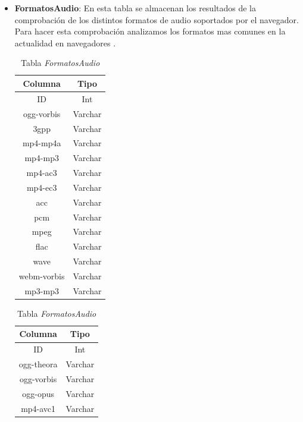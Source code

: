 \begin{itemize}
    \item \textbf{FormatosAudio}: En esta tabla se almacenan los resultados de la comprobación de los distintos formatos de audio soportados por el navegador. Para hacer esta comprobación analizamos los formatos mas comunes en la actualidad en navegadores \cite{Formatos}. \par
    \begin{table}[tbp]
    \centering
        \begin{minipage}[c]{70mm}
        \centering
            \begin{tabular}{c|c}
                \textbf{Columna} & \textbf{Tipo} \\ \hline
                ID & Int\\
                ogg-vorbis & Varchar\\
                3gpp & Varchar\\
                mp4-mp4a & Varchar\\
                mp4-mp3 & Varchar\\
                mp4-ac3 & Varchar\\
                mp4-ec3 & Varchar\\
                acc & Varchar\\
                pcm & Varchar\\
                mpeg & Varchar\\
                flac & Varchar\\
                wave & Varchar\\
                webm-vorbis & Varchar\\
                mp3-mp3 & Varchar\\
            \end{tabular}
            \caption{Tabla \textit{FormatosAudio}}
            \label{tab:formatosAudio}
        \end{minipage}
        \begin{minipage}[c]{70mm}
        \centering
            \begin{tabular}{c|c}
                \textbf{Columna} & \textbf{Tipo} \\ \hline
                ID & Int\\
                ogg-theora & Varchar\\
                ogg-vorbis & Varchar\\
                ogg-opus & Varchar\\
                mp4-avc1 & Varchar\\

\end{tabular}
\end{minipage}
\end{table}
\end{itemize}
